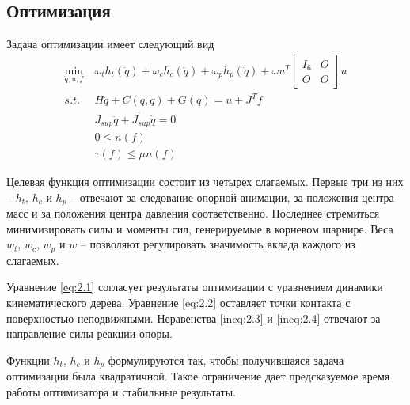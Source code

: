 
\subsection{Оптимизация}





Задача оптимизации имеет следующий вид
\begin{align*}
  \min_{\ddot{q}, u, f} &\ \omega_{t} h_{t}(\ddot{q}) + \omega_{c} h_{c}(\ddot{q}) + \omega_{p} h_{p}(\ddot{q}) + \omega u^{T} \begin{bmatrix} I_{6} & O \\ O & O \end{bmatrix} u \\
  s.t. &\ H \ddot{q} + C(q, \dot{q}) + G(q) = u + J^{T} f \tag{2.1}\label{eq:2.1} \\
       &\ J_{sup} \ddot{q} + \dot{J_{sup}} \dot{q} = 0 \tag{2.2}\label{eq:2.2} \\
       &\ 0 \le n(f) \tag{2.3}\label{ineq:2.3} \\
       &\ \tau(f) \le \mu n(f) \tag{2.4}\label{ineq:2.4}
\end{align*}

Целевая функция оптимизации состоит из четырех слагаемых. Первые три из них -- $h_{t}$, $h_{c}$ и $h_{p}$ -- отвечают за следование опорной анимации, за положения центра масс и за положения центра давления соответственно. Последнее стремиться минимизировать силы и моменты сил, генерируемые в корневом шарнире. Веса $w_{t}$, $w_{c}$, $w_{p}$ и $w$ -- позволяют регулировать значимость вклада каждого из слагаемых.

Уравнение \ref{eq:2.1} согласует результаты оптимизации с уравнением динамики кинематического дерева. Уравнение \ref{eq:2.2} оставляет точки контакта с поверхностью неподвижными. Неравенства \ref{ineq:2.3} и \ref{ineq:2.4} отвечают за направление силы реакции опоры.

Функции $h_{t}$, $h_{c}$ и $h_{p}$ формулируются так, чтобы получившаяся задача оптимизации была квадратичной. Такое ограничение дает предсказуемое время работы оптимизатора и стабильные результаты.

